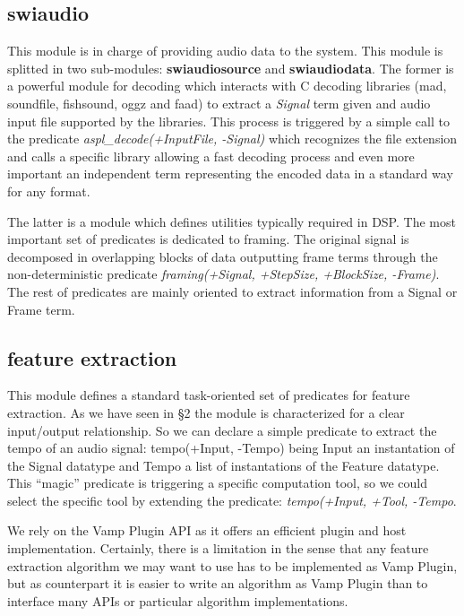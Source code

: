 \documentclass{article}
\begin{document}
\subsection{swiaudio}

This module is in charge of providing audio data to the system. This module is splitted in two sub-modules: \textbf{swiaudiosource} and \textbf{swiaudiodata}. The former is a powerful module for decoding which interacts with C decoding libraries (mad, soundfile, fishsound, oggz and faad) to extract a \textit{Signal} term given and audio input file supported by the libraries. This process is triggered by a simple call to the predicate \textit{aspl\_decode(+InputFile, -Signal)} which recognizes the file extension and calls a specific library allowing a fast decoding process and even more important an independent term representing the encoded data in a standard way for any format.

The latter is a module which defines utilities typically required in DSP. The most important set of predicates is dedicated to framing. The original signal is decomposed in overlapping blocks of data outputting frame terms through the non-deterministic predicate \textit{framing(+Signal, +StepSize, +BlockSize, -Frame)}. The rest of predicates are mainly oriented to extract information from a Signal or Frame term.
 
\subsection{feature extraction}

This module defines a standard task-oriented set of predicates for feature extraction. As we have seen in \S 2 the module is characterized for a clear input/output relationship. So we can declare a simple predicate to extract the tempo of an audio signal: tempo(+Input, -Tempo) being Input an instantation of the Signal datatype and Tempo a list of instantations of the Feature datatype. This ``magic'' predicate is triggering a specific computation tool, so we could select the specific tool by extending the predicate: \textit{tempo(+Input, +Tool, -Tempo}.

We rely on the Vamp Plugin API as it offers an efficient plugin and host implementation. Certainly, there is a limitation in the sense that any feature extraction algorithm we may want to use has to be implemented as Vamp Plugin, but as counterpart it is easier to write an algorithm as Vamp Plugin than to interface many APIs or particular algorithm implementations.
\end{document}
